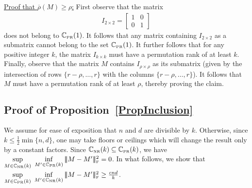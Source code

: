 \documentclass[11pt, hidelinks]{article} %
\newcommand{\matsnorm}[2]{|\!|\!| #1 | \! | \!|_{{#2}}}
\newcommand{\frobnorm}[1]{\ensuremath{\matsnorm{#1}{\mbox{\tiny{F}}}}}
\newcommand{\half}{\ensuremath{{\frac{1}{2}}}}
\newcommand{\identitymx}{I}
\newcommand{\numrows}{n}
\newcommand{\numcols}{d}
\newcommand{\plaincon}{c}
\newcommand{\wtmatrix}{M}
\newcommand{\wt}{\wtmatrix}
\newcommand{\matrixset}{\mathbb{C}}
\newcommand{\nnset}{\matrixset_{\mbox{\tiny NR}}}
\newcommand{\permset}{\matrixset_{\mbox{\tiny PR}}}
\newcommand{\nnrank}{r}
\newcommand{\permrank}{\rho}
\newcommand{\temprank}{k}
\newcommand{\fnpermrank}[1]{\overline{\permrank}(#1)}
\begin{document}
\noindent \underline{Proof that $\fnpermrank{\wtmatrix} \geq
  \permrank$:} 
%
First observe that the matrix
\begin{align*}
\identitymx_{2 \times 2} =
\begin{bmatrix}
1 & 0 \\ 0 & 1
\end{bmatrix}
\end{align*}
does not belong to $\permset(1)$. It follows that any matrix containing $\identitymx_{2 \times 2}$ as a
submatrix cannot belong to the set $\permset(1)$. It further follows
that for any positive integer $k$, the matrix $\identitymx_{k \times
  k}$ must have a permutation rank of at least $k$. Finally, observe
that the matrix $\wtmatrix$ contains
$\identitymx_{\permrank \times \permrank}$ as its submatrix (given by
the intersection of rows $\{\nnrank - \permrank, \ldots, \nnrank\}$
with the columns $\{\nnrank - \permrank, \ldots, \nnrank\}$). It
follows that $\wtmatrix$ must have a permutation rank of at least
$\permrank$, thereby proving the claim.


\subsection{Proof of Proposition~\ref{PropInclusion}}

We assume for ease of exposition that $\numrows$ and $\numcols$ are
divisible by $\temprank$. Otherwise, since $\temprank \leq \half
\min\{\numrows, \numcols\}$, one may take floors or ceilings which
will change the result only by a constant factors. Since $\nnset(\temprank) \subseteq \permset(\temprank)$, we have $\sup \limits_{\wt
	\in \nnset(\temprank) } \ \inf \limits_{\wt' \in \permset(\temprank) } \frobnorm{\wt - \wt'}^2 = 0$. In what follows, we show that $\sup \limits_{\wt
	\in \permset(\temprank)} \ \inf \limits_{\wt' \in \nnset(\temprank)} \frobnorm{\wt - \wt'}^2 \geq \frac{\plaincon \numrows \numcols }{ \temprank}$.
\end{document}
